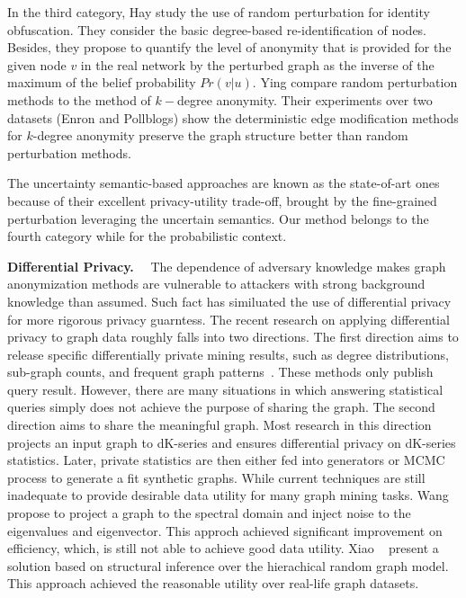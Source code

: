In the third category, Hay {\etal} \cite{Liu_Privacy_2009} study the use of random perturbation for identity obfuscation. They consider the basic degree-based re-identification of nodes. Besides, they propose to quantify the level of anonymity that is provided for the given node $v$ in the real network by the perturbed graph as the inverse of the maximum of the belief probability $Pr(v|u)$. Ying {\etal} \cite{Ying_Randomizing_2008} compare random perturbation methods to the method of $k-$degree anonymity. Their experiments over two datasets (Enron and Pollblogs) show the deterministic edge modification methods for $k$-degree anonymity preserve the graph structure better than random perturbation methods.

The uncertainty semantic-based approaches are known as the state-of-art ones because of their excellent privacy-utility trade-off, brought by the fine-grained perturbation leveraging the uncertain semantics. 
Our method belongs to the fourth category while for the probabilistic context. 

 
\textbf{Differential Privacy.}~~
The dependence of adversary knowledge makes graph anonymization methods are vulnerable to attackers with strong background knowledge than assumed. Such fact has similuated the use of differential privacy for more rigorous privacy guarntess. 
The recent research on applying differential privacy to graph data roughly falls into two directions. The first direction aims to release specific differentially private mining results, such as degree distributions, sub-graph counts, and frequent graph patterns~\cite{Xiao_Differentially_2014,Day:2016}. These methods only publish query result. However, there are many situations in which answering statistical queries simply does not achieve the purpose of sharing the graph.  
The second direction aims to share the meaningful graph. Most research in this direction~\cite{Sala_Sharing_2011,Proserpio_2012} projects an input graph to dK-series and ensures differential privacy on dK-series statistics. Later, private statistics are then either fed into generators or MCMC process to generate a fit synthetic graphs. While current techniques are still inadequate to provide desirable data utility for many graph mining tasks. Wang {\etal}~\cite{Wang_2013} propose to project a graph to the spectral domain and inject noise to the eigenvalues and eigenvector. This approch achieved significant improvement on efficiency, which, is still not able to achieve good data utility. Xiao {\etal}~\cite{Xiao_Differentially_2014} present a solution based on structural inference over the hierachical random graph model. This approach achieved the reasonable utility over real-life graph datasets. 

